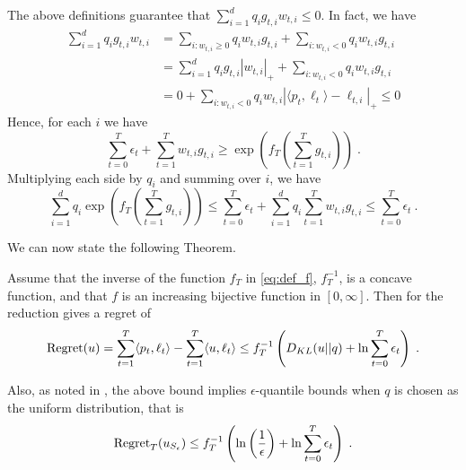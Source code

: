 The above definitions guarantee that $\sum_{i=1}^d q_i g_{t,i} w_{t,i} \le 0$. In fact, we have
\begin{align*}
\sum_{i=1}^d q_i g_{t,i} w_{t,i}
& = \sum_{i:w_{t,i}\ge 0} q_i w_{t,i} g_{t,i} + \sum_{i:w_{t,i} < 0} q_i w_{t,i} g_{t,i} \\
& = \sum_{i=1}^d q_i g_{t,i} |w_{t,i}|_+ + \sum_{i:w_{t,i} < 0} q_i w_{t,i} g_{t,i} \\
& = 0 + \sum_{i:w_{t,i} < 0} q_i w_{t,i} |\langle p_t, \ell_t\rangle - \ell_{t,i}|_+ \le 0
\end{align*}
Hence, for each $i$ we have
\[
\sum_{t=0}^T \epsilon_t + \sum_{t=1}^T w_{t,i} g_{t,i} \geq \exp\left(f_T \left( \sum_{t=1}^T g_{t,i} \right)\right) \; .
\]
Multiplying each side by $q_i$ and summing over $i$, we have
\begin{equation}
\label{eq:bounded_potential}
\sum_{i=1}^d q_i \exp\left(f_T\left(\sum_{t=1}^T g_{t,i} \right)\right) \leq \sum_{t=0}^T \epsilon_t + \sum_{i=1}^d q_i \sum_{t=1}^T w_{t,i} g_{t,i} \le \sum_{t=0}^T \epsilon_t~.
\end{equation}

We can now state the following Theorem.
\begin{theorem}
\label{theo:expert_reduction}
Assume that the inverse of the function $f_T$ in \eqref{eq:def_f}, $f_T^{-1}$, is a concave function, and that $f$ is an increasing bijective function in $[0,\infty]$.
Then for the reduction gives a regret of 
\[
\operatorname{Regret}(u) = \sum_{t=1}^T \langle p_t, \ell_t \rangle - \sum_{t=1}^T \langle u, \ell_t \rangle \leq f_T^{-1}\left(D_{KL}(u||q) + \ln \sum_{t=0}^T \epsilon_t\right) \;.
\]
\end{theorem}

Also, as noted in \citet{LuoS15}, the above bound implies $\epsilon$-quantile bounds when $q$ is chosen as the uniform distribution, that is
\[
\operatorname{Regret}_T(u_{S_\epsilon}) \leq f_T^{-1}\left(\ln\left(\frac{1}{\epsilon}\right) + \ln \sum_{t=0}^T \epsilon_t\right) \; .
\]